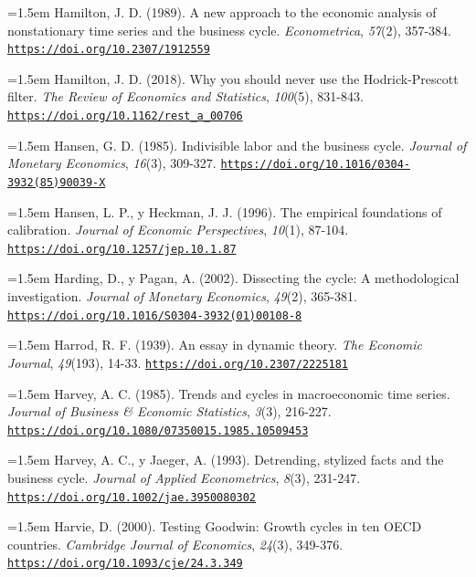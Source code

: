 \documentclass[10pt,a4paper]{article}
\begin{document}
\noindent\hangindent=1.5em Hamilton, J. D. (1989). A new approach to the economic analysis of nonstationary time series and the business cycle. \textit{Econometrica}, \textit{57}(2), 357-384. \href{https://doi.org/10.2307/1912559}{\nolinkurl{https://doi.org/10.2307/1912559}}

\noindent\hangindent=1.5em Hamilton, J. D. (2018). Why you should never use the Hodrick-Prescott filter. \textit{The Review of Economics and Statistics}, \textit{100}(5), 831-843. \href{https://doi.org/10.1162/rest_a_00706}{\nolinkurl{https://doi.org/10.1162/rest_a_00706}}

\noindent\hangindent=1.5em Hansen, G. D. (1985). Indivisible labor and the business cycle. \textit{Journal of Monetary Economics}, \textit{16}(3), 309-327. \href{https://doi.org/10.1016/0304-3932(85)90039-X}{\nolinkurl{https://doi.org/10.1016/0304-3932(85)90039-X}}

\noindent\hangindent=1.5em Hansen, L. P., y Heckman, J. J. (1996). The empirical foundations of calibration. \textit{Journal of Economic Perspectives}, \textit{10}(1), 87-104. \href{https://doi.org/10.1257/jep.10.1.87}{\nolinkurl{https://doi.org/10.1257/jep.10.1.87}}

\noindent\hangindent=1.5em Harding, D., y Pagan, A. (2002). Dissecting the cycle: A methodological investigation. \textit{Journal of Monetary Economics}, \textit{49}(2), 365-381. \href{https://doi.org/10.1016/S0304-3932(01)00108-8}{\nolinkurl{https://doi.org/10.1016/S0304-3932(01)00108-8}}

\noindent\hangindent=1.5em Harrod, R. F. (1939). An essay in dynamic theory. \textit{The Economic Journal}, \textit{49}(193), 14-33. \href{https://doi.org/10.2307/2225181}{\nolinkurl{https://doi.org/10.2307/2225181}}

\noindent\hangindent=1.5em Harvey, A. C. (1985). Trends and cycles in macroeconomic time series. \textit{Journal of Business \& Economic Statistics}, \textit{3}(3), 216-227. \href{https://doi.org/10.1080/07350015.1985.10509453}{\nolinkurl{https://doi.org/10.1080/07350015.1985.10509453}}

\noindent\hangindent=1.5em Harvey, A. C., y Jaeger, A. (1993). Detrending, stylized facts and the business cycle. \textit{Journal of Applied Econometrics}, \textit{8}(3), 231-247. \href{https://doi.org/10.1002/jae.3950080302}{\nolinkurl{https://doi.org/10.1002/jae.3950080302}}

\noindent\hangindent=1.5em Harvie, D. (2000). Testing Goodwin: Growth cycles in ten OECD countries. \textit{Cambridge Journal of Economics}, \textit{24}(3), 349-376. \href{https://doi.org/10.1093/cje/24.3.349}{\nolinkurl{https://doi.org/10.1093/cje/24.3.349}}
\end{document}
